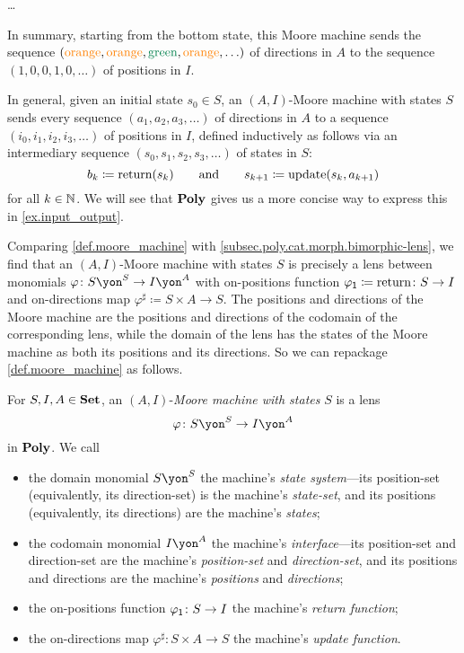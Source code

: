 \documentclass[Book-Poly]{subfiles}
\begin{document}
\begin{example}
\begin{enumerate}
    \ldots
\end{enumerate}
In summary, starting from the bottom state, this Moore machine sends the sequence $({\color{orange}\text{orange}}, {\color{orange}\text{orange}}, {\color{dgreen}\text{green}}, {\color{orange}\text{orange}},\ldots)$ of directions in $A$ to the sequence $(1,0,0,1,0,\ldots)$ of positions in $I$.
\end{example}

In general, given an initial state $s_0\in S$, an $(A,I)$-Moore machine with states $S$ sends every sequence $(a_1,a_2,a_3,\ldots)$ of directions in $A$ to a sequence $(i_0,i_1,i_2,i_3,\ldots)$ of positions in $I$, defined inductively as follows via an intermediary sequence $(s_0,s_1,s_2,s_3,\ldots)$ of states in $S$:
\[
    b_k\coloneqq \text{return}(s_k) \qquad\text{and}\qquad s_{k+1}\coloneqq \text{update}(s_k, a_{k+1})
\]
for all $k\in\mathbb{N}$.
We will see that $\mathbf{Poly}$ gives us a more concise way to express this in \cref{ex.input_output}.

Comparing \cref{def.moore_machine} with \cref{subsec.poly.cat.morph.bimorphic-lens}, we find that an $(A,I)$-Moore machine with states $S$ is precisely a lens between monomials $\varphi\colon S\yon^S\to I\yon^A$ with on-positions function $\varphi_{\textsf{1}}\coloneqq\text{return}\colon S\to I$ and on-directions map $\varphi^\sharp\coloneqq S\times A\to S$.
The positions and directions of the Moore machine are the positions and directions of the codomain of the corresponding lens, while the domain of the lens has the states of the Moore machine as both its positions and its directions.
So we can repackage \cref{def.moore_machine} as follows.

\begin{definition}\label{def.moore_machine2}
  For $S,I,A\in\mathbf{Set}$, an $(A,I)$-\emph{Moore machine with states} $S$ is a lens \[\varphi\colon S\yon^S\to I\yon^A\] in $\mathbf{Poly}$.
  We call
  \begin{itemize}
    \item the domain monomial $S\yon^S$ the machine's \emph{state system}---its position-set (equivalently, its direction-set) is the machine's \emph{state-set}, and its positions (equivalently, its directions) are the machine's \emph{states};
    \item the codomain monomial $I\yon^A$ the machine's \emph{interface}---its position-set and direction-set are the machine's \emph{position-set} and \emph{direction-set}, and its positions and directions are the machine's \emph{positions} and \emph{directions};
    \item the on-positions function $\varphi_{\textsf{1}}\colon S\to I$ the machine's \emph{return function};
    \item the on-directions map $\varphi^\sharp\colon S\times A\to S$ the machine's \emph{update function}.
  \end{itemize}
\end{definition}
\end{document}
